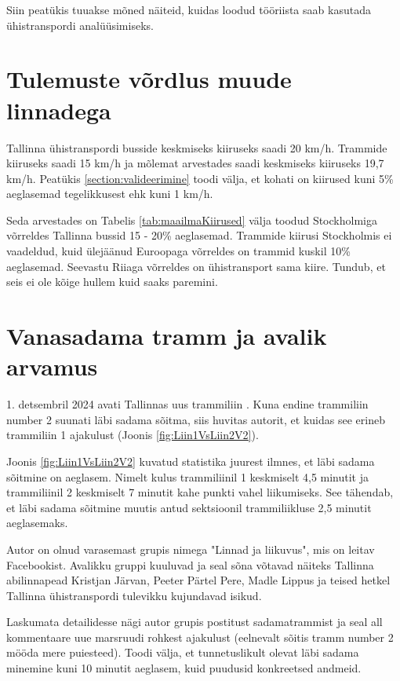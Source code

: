 
Siin peatükis tuuakse mõned näiteid, kuidas loodud tööriista saab kasutada ühistranspordi analüüsimiseks.

\section{Tulemuste võrdlus muude linnadega}


Tallinna ühistranspordi busside keskmiseks kiiruseks saadi 20 km/h. Trammide kiiruseks saadi 15 km/h ja mõlemat arvestades saadi keskmiseks kiiruseks 19,7 km/h.
Peatükis \ref{section:valideerimine} toodi välja, et kohati on kiirused kuni 5\% aeglasemad tegelikkusest ehk kuni 1 km/h.

Seda arvestades on Tabelis \ref{tab:maailmaKiirused} välja toodud Stockholmiga võrreldes Tallinna bussid 15 - 20\% aeglasemad.
Trammide kiirusi Stockholmis ei vaadeldud, kuid ülejäänud Euroopaga võrreldes on trammid kuskil 10\% aeglasemad. Seevastu Riiaga võrreldes on ühistransport sama kiire. Tundub, et seis ei ole kõige hullem kuid saaks paremini.

\section{Vanasadama tramm ja avalik arvamus} 

1. detsembril 2024 avati Tallinnas uus trammiliin \cite{err_trammiliin_2024}. Kuna endine trammiliin number 2 suunati läbi sadama sõitma, siis huvitas autorit, et kuidas see erineb trammiliin 1 ajakulust (Joonis \ref{fig:Liin1VsLiin2V2}).
 
Joonis \ref{fig:Liin1VsLiin2V2} kuvatud statistika juurest ilmnes, et läbi sadama sõitmine on aeglasem. Nimelt kulus trammiliinil 1 keskmiselt 4,5 minutit ja trammiliinil 2 keskmiselt 7 minutit kahe punkti vahel liikumiseks. See tähendab, et läbi sadama sõitmine muutis antud sektsioonil trammiliikluse 2,5 minutit aeglasemaks. 

Autor on olnud varasemast grupis nimega "Linnad ja liikuvus", mis on leitav Facebookist. Avalikku gruppi kuuluvad ja seal sõna võtavad näiteks Tallinna abilinnapead Kristjan Järvan, Peeter Pärtel Pere, Madle Lippus ja teised hetkel Tallinna ühistranspordi tulevikku kujundavad isikud.

Laskumata detailidesse nägi autor grupis postitust sadamatrammist  ja seal all kommentaare uue marsruudi rohkest ajakulust (eelnevalt sõitis tramm number 2 mööda mere puiesteed). Toodi välja, et tunnetuslikult olevat läbi sadama minemine kuni 10 minutit aeglasem, kuid puudusid konkreetsed andmeid.

